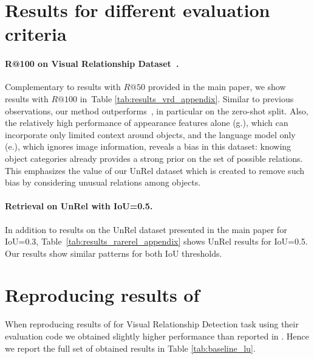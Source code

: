 \documentclass[10pt,twocolumn,letterpaper]{article}
\begin{document}
\section{Results for different evaluation criteria}
\label{part:quantitative}

\paragraph{R@100 on Visual Relationship Dataset~\cite{Lu16}.} Complementary to results with $R@50$ provided in the main paper, we show results with $R@100$ in~Table \ref{tab:results_vrd_appendix}. Similar to previous observations, our method outperforms~\cite{Lu16,Sadeghi2011}, in particular on the zero-shot split. Also, the relatively high performance of appearance features alone (g.), which can incorporate only limited context around objects, and the language model only (e.), which ignores image information, reveals a bias in this dataset: knowing object categories already provides a strong prior on the set of possible relations. This emphasizes the value of our UnRel dataset which is created to remove such bias by considering unusual relations among objects.

\paragraph{Retrieval on UnRel with IoU=0.5.}
In addition to results on the UnRel dataset presented in the main paper for IoU=0.3, Table~\ref{tab:results_rarerel_appendix} shows UnRel results for IoU=0.5. Our results show similar patterns for both IoU thresholds. 

\section{Reproducing results of \cite{Lu16}}
\label{part:lu-baseline}
When reproducing results of \cite{Lu16} for Visual Relationship Detection task using their evaluation code we obtained slightly higher performance than reported in \cite{Lu16}. Hence we report the full set of obtained results in Table \ref{tab:baseline_lu}.
\end{document}
